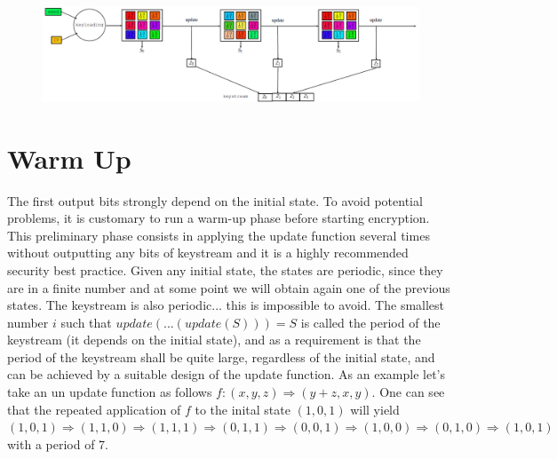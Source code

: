 \begin{figure}
	\centering
	\includegraphics[width=0.9\linewidth]{Images/Chapter2/screenshot004}
	\caption{}
	\label{fig:chapter2_screenshot004}
\end{figure}

\section{Warm Up}

The first output bits strongly depend on the initial state. To avoid potential problems, it is customary to run a warm-up phase before starting encryption. This preliminary phase consists in applying the update function several times without outputting any bits of keystream and it is a highly recommended security best practice.
Given any initial state, the states are periodic, since they are in a finite number and at some point we will obtain again one of the previous states. The keystream is also periodic... this is impossible to avoid. The smallest number $i$ such that $update(...(update(S)))=S$ is called the period of the keystream (it depends on the initial state), and as a requirement is that the period of the keystream shall be quite large, regardless of the initial state, and can be achieved by a suitable design of the update function.
As an example let's take an un update function as follows $f: (x,y,z) \Rightarrow (y+z,x,y)$. One can see that the repeated application of $f$ to the inital state $(1,0,1)$ will yield $(1,0,1) \Rightarrow (1,1,0) \Rightarrow (1,1,1) \Rightarrow (0,1,1) \Rightarrow (0,0,1) \Rightarrow (1,0,0) \Rightarrow (0,1,0) \Rightarrow (1,0,1)$ with a period of 7.


